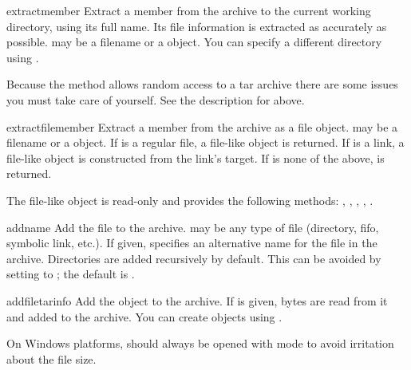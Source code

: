 \begin{methoddesc}{extract}{member}
    Extract a member from the archive to the current working directory,
    using its full name. Its file information is extracted as accurately as
    possible.
     may be a filename or a  object.
    You can specify a different directory using .
    \begin{notice}
    Because the  method allows random access to a tar
    archive there are some issues you must take care of yourself. See the
    description for  above.
    \end{notice}
\end{methoddesc}

\begin{methoddesc}{extractfile}{member}
    Extract a member from the archive as a file object.
     may be a filename or a  object.
    If  is a regular file, a file-like object is returned.
    If  is a link, a file-like object is constructed from the
    link's target.
    If  is none of the above,  is returned.
    \begin{notice}
        The file-like object is read-only and provides the following methods:
        , , ,
        , .
    \end{notice}
\end{methoddesc}

\begin{methoddesc}{add}{name}
    Add the file  to the archive.  may be any type
    of file (directory, fifo, symbolic link, etc.).
    If given,  specifies an alternative name for the file in the
    archive. Directories are added recursively by default.
    This can be avoided by setting  to ;
    the default is .
\end{methoddesc}

\begin{methoddesc}{addfile}{tarinfo}
    Add the  object  to the archive.
    If  is given,  bytes are read
    from it and added to the archive.  You can create  objects
    using .
    \begin{notice}
    On Windows platforms,  should always be opened with mode
     to avoid irritation about the file size.
    \end{notice}
\end{methoddesc}


